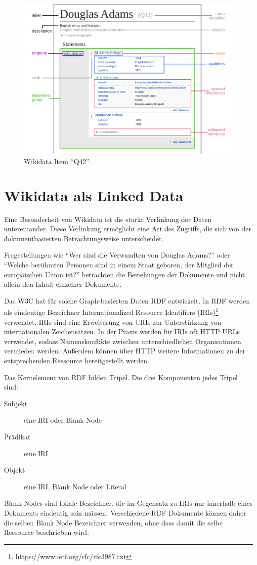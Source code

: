 \begin{figure}
  \includegraphics[width=\linewidth]{pics/Datamodel_in_Wikidata}
  \caption{Wikidata Item "`Q42"'}
  \label{fig:wd-datamodel}
\end{figure}

\section{Wikidata als Linked Data}
Eine Besonderheit von Wikidata ist die starke Verlinkung der Daten untereinander.
Diese Verlinkung ermöglicht eine Art des Zugriffs, die sich von der dokumentbasierten Betrachtungsweise unterscheidet.


Fragestellungen wie "`Wer sind die Verwandten von Douglas Adams?"' oder "`Welche berühmten Personen sind in einem Staat geboren, der Mitglied der europäischen Union ist?"' betrachten die Beziehungen der Dokumente und nicht allein den Inhalt einzelner Dokumente.

Das W3C hat für solche Graph-basierten Daten RDF entwickelt.
In RDF werden als eindeutige Bezeichner Internationalized Resource Identifiers (IRIs)\footnote{https://www.ietf.org/rfc/rfc3987.txt} verwendet.
IRIs sind eine Erweiterung von URIs zur Unterstützung von internationalen Zeichensätzen.
In der Praxis werden für IRIs oft HTTP URLs verwendet, sodass Namenskonflikte zwischen unterschiedlichen Organisationen vermieden werden.
Außerdem können über HTTP weitere Informationen zu der entsprechenden Ressource bereitgestellt werden.

Das Kernelement von RDF bilden Tripel. Die drei Komponenten jedes Tripel sind:
\begin{description}
\item[Subjekt] eine IRI oder Blank Node
\item[Prädikat] eine IRI
\item[Objekt] eine IRI, Blank Node oder Literal
\end{description}
Blank Nodes sind lokale Bezeichner, die im Gegensatz zu IRIs nur innerhalb eines Dokuments eindeutig sein müssen.
Verschiedene RDF Dokumente können daher die selben Blank Node Bezeichner verwenden, ohne dass damit die selbe Ressource beschrieben wird.


